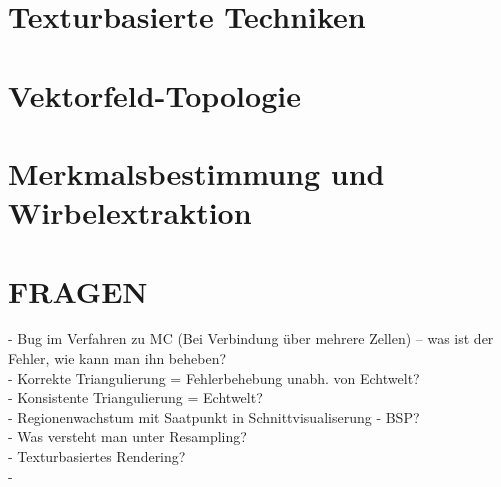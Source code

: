 \documentclass{article}
\begin{document}
\pagebreak
\section{Texturbasierte Techniken}

\pagebreak
\section{Vektorfeld-Topologie}

\pagebreak
\section{Merkmalsbestimmung und Wirbelextraktion}


\pagebreak
\section{FRAGEN}
- Bug im Verfahren zu MC (Bei Verbindung über mehrere Zellen) -- was ist der Fehler, wie kann man ihn beheben?\\
- Korrekte Triangulierung = Fehlerbehebung unabh. von Echtwelt?\\ 
- Konsistente Triangulierung = Echtwelt?\\
- Regionenwachstum mit Saatpunkt in Schnittvisualiserung - BSP?\\
- Was versteht man unter Resampling?\\
- Texturbasiertes Rendering?\\
- 
\end{document}
